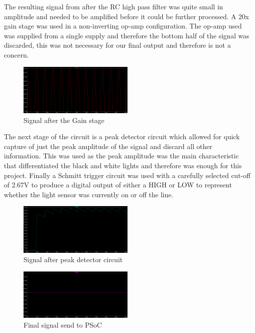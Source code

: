 \documentclass{article}
\begin{document}
The resulting signal from after the RC high pass filter was quite small in amplitude and needed to be amplified before it could be further processed. A 20x gain stage was used in a non-inverting op-amp configuration. The op-amp used was supplied from a single supply and therefore the bottom half of the signal was discarded, this was not necessary for our final output and therefore is not a concern.

\begin{figure}[!h]
\centerline{\includegraphics[width=0.5\textwidth]{stage_3}}
\caption{Signal after the Gain stage}
\label{fig:stage3}
\end{figure}

The next stage of the circuit is a peak detector circuit which allowed for quick capture of just the peak amplitude of the signal and discard all other information. This was used as the peak amplitude was the main characteristic that differentiated the black and white lights and therefore was enough for this project. Finally a Schmitt trigger circuit was used with a carefully selected cut-off of 2.67V to produce a digital output of either a HIGH or LOW to represent whether the light sensor was currently on or off the line.

\begin{figure}[!h]
\centerline{\includegraphics[width=0.5\textwidth]{stage_4}}
\caption{Signal after peak detector circuit}
\label{fig:stage4}
\end{figure}

\begin{figure}[!h]
\centerline{\includegraphics[width=0.5\textwidth]{stage_5}}
\caption{Final signal send to PSoC}
\label{fig:stage5}
\end{figure}
\end{document}
